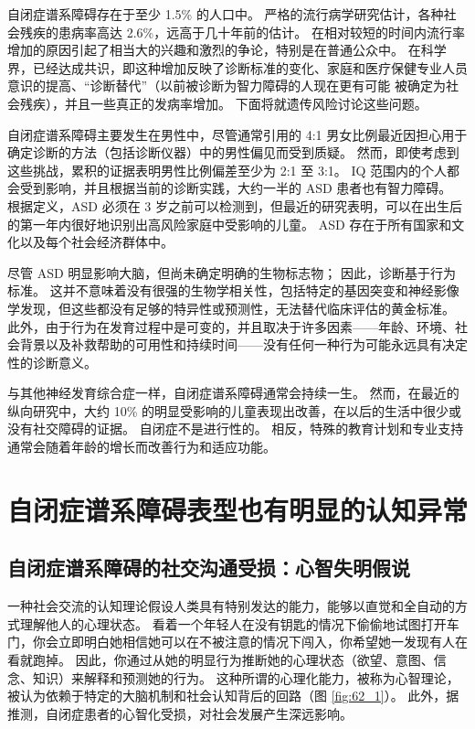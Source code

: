 自闭症谱系障碍存在于至少 1.5\% 的人口中。 严格的流行病学研究估计，各种社会残疾的患病率高达 2.6\%，远高于几十年前的估计。 在相对较短的时间内流行率增加的原因引起了相当大的兴趣和激烈的争论，特别是在普通公众中。 在科学界，已经达成共识，即这种增加反映了诊断标准的变化、家庭和医疗保健专业人员意识的提高、“诊断替代”（以前被诊断为智力障碍的人现在更有可能 被确定为社会残疾），并且一些真正的发病率增加。 下面将就遗传风险讨论这些问题。

自闭症谱系障碍主要发生在男性中，尽管通常引用的 4:1 男女比例最近因担心用于确定诊断的方法（包括诊断仪器）中的男性偏见而受到质疑。 然而，即使考虑到这些挑战，累积的证据表明男性比例偏差至少为 2:1 至 3:1。 IQ 范围内的个人都会受到影响，并且根据当前的诊断实践，大约一半的 ASD 患者也有智力障碍。 根据定义，ASD 必须在 3 岁之前可以检测到，但最近的研究表明，可以在出生后的第一年内很好地识别出高风险家庭中受影响的儿童。 ASD 存在于所有国家和文化以及每个社会经济群体中。

尽管 ASD 明显影响大脑，但尚未确定明确的生物标志物； 因此，诊断基于行为标准。 这并不意味着没有很强的生物学相关性，包括特定的基因突变和神经影像学发现，但这些都没有足够的特异性或预测性，无法替代临床评估的黄金标准。 此外，由于行为在发育过程中是可变的，并且取决于许多因素——年龄、环境、社会背景以及补救帮助的可用性和持续时间——没有任何一种行为可能永远具有决定性的诊断意义。

与其他神经发育综合症一样，自闭症谱系障碍通常会持续一生。 然而，在最近的纵向研究中，大约 10\% 的明显受影响的儿童表现出改善，在以后的生活中很少或没有社交障碍的证据。 自闭症不是进行性的。 相反，特殊的教育计划和专业支持通常会随着年龄的增长而改善行为和适应功能。

\section{自闭症谱系障碍表型也有明显的认知异常}


\subsection{自闭症谱系障碍的社交沟通受损：心智失明假说}
一种社会交流的认知理论假设人类具有特别发达的能力，能够以直觉和全自动的方式理解他人的心理状态。 看着一个年轻人在没有钥匙的情况下偷偷地试图打开车门，你会立即明白她相信她可以在不被注意的情况下闯入，你希望她一发现有人在看就跑掉。 因此，你通过从她的明显行为推断她的心理状态（欲望、意图、信念、知识）来解释和预测她的行为。 这种所谓的心理化能力，被称为心智理论，被认为依赖于特定的大脑机制和社会认知背后的回路（图 \ref{fig:62_1}）。 此外，据推测，自闭症患者的心智化受损，对社会发展产生深远影响。

